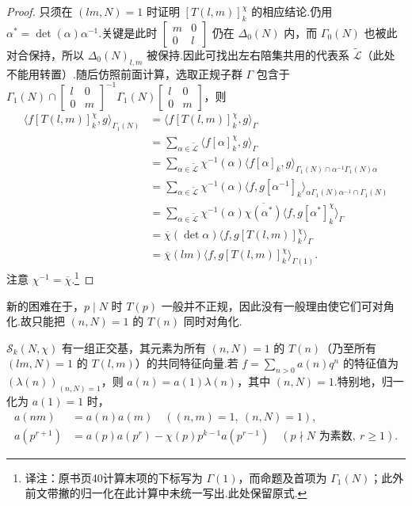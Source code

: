 \begin{proof}

只须在 $(lm,N)=1$ 时证明 $[T(l,m)]_k^\chi$ 的相应结论.仍用 $\alpha^*=\det(\alpha)\alpha^{-1}$.关键是此时 $\left[\begin{smallmatrix}m&0\\0&l\end{smallmatrix}\right]$ 仍在 $\Delta_0(N)$ 内，而 $\Gamma_0(N)$ 也被此对合保持，所以 $\Delta_0(N)_{l,m}$ 被保持.因此可找出左右陪集共用的代表系 $\widetilde{\mathcal L}$（此处不能用转置）.随后仿照前面计算，选取正规子群 $\Gamma$ 包含于 $\Gamma_1(N)\cap\left[\begin{smallmatrix}l&0\\0&m\end{smallmatrix}\right]^{-1}\Gamma_1(N)\left[\begin{smallmatrix}l&0\\0&m\end{smallmatrix}\right]$，则
\begin{align*}
\langle f[T(l,m)]_k^\chi,g\rangle_{\Gamma_1(N)}&=\langle f[T(l,m)]_k^\chi,g\rangle_\Gamma\\
&=\sum_{\alpha\in\widetilde{\mathcal L}}\langle f[\alpha]_k^\chi,g\rangle_\Gamma\\
&=\sum_{\alpha\in\widetilde{\mathcal L}}\chi^{-1}(\alpha)\langle f[\alpha]_k,g\rangle_{\Gamma_1(N)\cap\alpha^{-1}\Gamma_1(N)\alpha}\\
&=\sum_{\alpha\in\widetilde{\mathcal L}}\chi^{-1}(\alpha)\langle f,g[\alpha^{-1}]_k\rangle_{\alpha\Gamma_1(N)\alpha^{-1}\cap\Gamma_1(N)}\\
&=\sum_{\alpha\in\widetilde{\mathcal L}}\chi^{-1}(\alpha)\overline{\chi(\alpha^*)}\langle f,g[\alpha^*]_k^\chi\rangle_\Gamma\\
&=\overline\chi(\det\alpha)\langle f,g[T(l,m)]_k^\chi\rangle_\Gamma\\
&=\overline\chi(lm)\langle f,g[T(l,m)]_k^\chi\rangle_{\Gamma(1)}.
\end{align*}
注意 $\chi^{-1}=\overline\chi$.\footnote{译注：原书页40计算末项的下标写为 $\Gamma(1)$，而命题及首项为 $\Gamma_1(N)$；此外前文带撇的归一化在此计算中未统一写出.此处保留原式.}

\end{proof}

新的困难在于，$p\mid N$ 时 $T(p)$ 一般并不正规，因此没有一般理由使它们可对角化.故只能把 $(n,N)=1$ 的 $T(n)$ 同时对角化.

\begin{corollary*}

$\mathcal S_k(N,\chi)$ 有一组正交基，其元素为所有 $(n,N)=1$ 的 $T(n)$（乃至所有 $(lm,N)=1$ 的 $T(l,m)$）的共同特征向量.若 $f=\sum_{n>0}a(n)q^n$ 的特征值为 $(\lambda(n))_{(n,N)=1}$，则 $a(n)=a(1)\lambda(n)$，其中 $(n,N)=1$.特别地，归一化为 $a(1)=1$ 时，
\begin{align*}
a(nm)&=a(n)a(m)\quad((n,m)=1,\ (n,N)=1),\\
a(p^{r+1})&=a(p)a(p^r)-\chi(p)p^{k-1}a(p^{r-1})\quad(p\nmid N\text{ 为素数},\ r\ge1).
\end{align*}
\end{corollary*}

